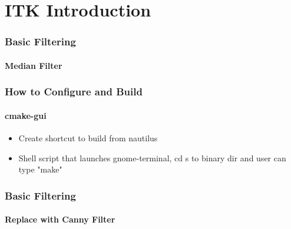 \section{ITK Introduction}



\begin{frame}
\frametitle{Basic Filtering}
\framesubtitle{Median Filter}
\begin{center}

\end{center}
\end{frame}

\begin{frame}
\frametitle{How to Configure and Build}
\framesubtitle{cmake-gui}
\begin{itemize}
\item Create shortcut to build from nautilus
\item Shell script that launches gnome-terminal, cd s to binary dir and user can type "make"
\end{itemize}
\end{frame}


\begin{frame}
\frametitle{Basic Filtering}
\framesubtitle{Replace with Canny Filter}
\begin{center}

\end{center}
\end{frame}
